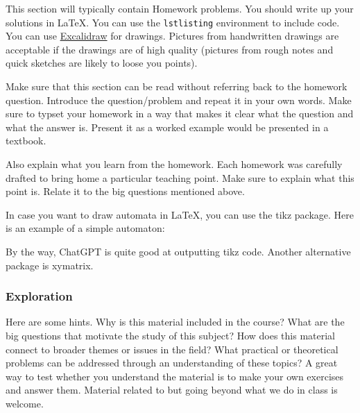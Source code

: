 \documentclass{article}
\theoremstyle{theorem}
\theoremstyle{definition}
\theoremstyle{remark}
\begin{document}
This section will typically contain Homework problems. You should write up your solutions in \LaTeX{}. You can use the \texttt{lstlisting} environment to include code. You can use \href{https://excalidraw.com/}{Excalidraw} for drawings. Pictures from handwritten drawings are acceptable if the drawings are of high quality (pictures from rough notes and quick sketches are likely to loose you points). 

Make sure that this section can be read without referring back to the homework question. Introduce the question/problem and repeat it in your own words. Make sure to typset your homework in a way that makes it clear what  the question and what the answer is. Present it as a worked example would be presented in a textbook. 

Also explain what you learn from the homework. Each homework was carefully drafted to bring home a particular teaching point. Make sure to explain what this point is. Relate it to the big questions mentioned above. 

In case you want to draw automata in \LaTeX{}, you can use the tikz package. Here is an example of a simple automaton:


By the way, ChatGPT is quite good at outputting tikz code. Another alternative package is xymatrix.

\subsubsection{Exploration}

Here are some hints. Why is this material included in the course? What are the big questions that motivate the study of this subject? How does this material connect to broader themes or issues in the field? What practical or theoretical problems can be addressed through an understanding of these topics? A great way to test whether you understand the material is to make your own exercises and answer them. Material related to but going beyond what we do in class is welcome.
\end{document}
